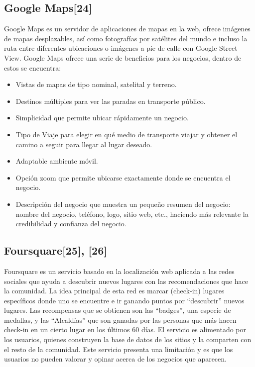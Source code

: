 \documentclass[12pt,letterpaper,openany]{book}
\begin{document}
\subsection{Google Maps[24]}
Google Maps es un servidor de aplicaciones de mapas en la web, ofrece imágenes de mapas desplazables, así como fotografías por satélites del mundo e incluso la ruta entre diferentes ubicaciones o imágenes a pie de calle con Google Street View.
Google Maps ofrece una serie de beneficios para los negocios, dentro de estos se encuentra: 
\begin{itemize}
    \item Vistas de mapas de tipo nominal, satelital y terreno.
    \item Destinos múltiples para ver las paradas en transporte público.
    \item Simplicidad que permite ubicar rápidamente un negocio.
    \item Tipo de Viaje para elegir en qué medio de transporte viajar y obtener el camino a seguir para llegar al lugar deseado.
    \item Adaptable ambiente móvil.
    \item Opción zoom que permite ubicarse exactamente donde se encuentra el negocio.
    \item Descripción del negocio que muestra un pequeño resumen del negocio: nombre del negocio, teléfono, logo, sitio web, etc., haciendo más relevante la credibilidad y confianza del negocio.
\end{itemize}

\subsection{Foursquare[25], [26]}
Foursquare es un servicio basado en la localización web aplicada a las redes sociales que ayuda a descubrir nuevos lugares con las recomendaciones que hace la comunidad.
La idea principal de esta red es marcar (check-in) lugares específicos donde uno se encuentre e ir ganando puntos por “descubrir” nuevos lugares.
Las recompensas que se obtienen son las “badges”, una especie de medallas, y las “Alcaldías” que son ganadas por las personas que más hacen check-in en un cierto lugar en los últimos 60 días.
El servicio es alimentado por los usuarios, quienes construyen la base de datos de los sitios y la comparten con el resto de la comunidad. Este servicio presenta una limitación y es que los usuarios no pueden valorar y opinar acerca de los negocios que aparecen.
\end{document}
